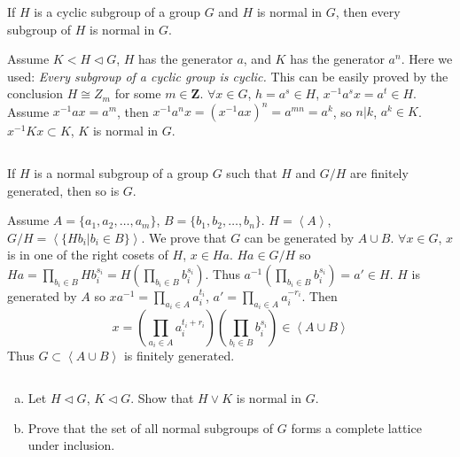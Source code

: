 $$ $$

\begin{ex}
    If $H$ is a cyclic subgroup of a group $G$ and $H$ is normal in $G$, then every subgroup of $H$ is normal in $G$.
\end{ex}

\begin{answer}
    Assume $K<H\lhd G$, $H$ has the generator $a$, and $K$ has the generator $a^{n}$. Here we used: \emph{Every subgroup of a cyclic group is cyclic.} This can be easily proved by the conclusion $H\cong Z_{m}$ for some $m\in \mathbf{Z}$. $\forall x\in G$, $h=a^{s}\in H$, $x^{-1}a^{s}x=a^{t}\in H$. Assume $x^{-1}ax=a^{m}$, then $x^{-1}a^{n}x=(x^{-1}ax)^{n}=a^{mn}=a^{k}$, so $n|k$, $a^{k}\in K$. $x^{-1}Kx\subset K$, $K$ is normal in $G$.
\end{answer}

$$ $$

\begin{ex}
    If $H$ is a normal subgroup of a group $G$ such that $H$ and $G/H$ are finitely generated, then so is $G$.
\end{ex}

\begin{answer}
    Assume $A=\{a_{1},a_{2},\dots, a_{m}\}$, $B=\{b_{1}, b_{2},\dots, b_{n}\}$. $H=\left\langle A\right\rangle$, $G /H=\left\langle \{Hb_{i}|b_{i}\in B\}\right\rangle$. We prove that $G$ can be generated by $A\cup B$. $\forall x\in G$, $x$ is in one of the right cosets of $H$, $x\in Ha$. $Ha\in G /H$ so $Ha=\prod\limits_{b_{i}\in B}Hb_{i}^{s_{i}}=H(\prod\limits_{b_{i}\in B}b_{i}^{s_{i}})$. Thus $a^{-1}(\prod\limits_{b_{i}\in B}b_{i}^{s_{i}})=a'\in H$. $H$ is generated by $A$ so $xa^{-1}=\prod\limits_{a_{i}\in A}a_{i}^{t_{i}}$, $a'=\prod\limits_{a_{i}\in A}a_{i}^{-r_{i}}$. Then \[x=(\prod\limits_{a_{i}\in A}a_{i}^{t_{i}+r_{i}})(\prod\limits_{b_{i}\in B}b_{i}^{s_{i}})\in\left\langle A\cup B\right\rangle\] Thus $G\subset\left\langle A\cup B\right\rangle$ is finitely generated.
\end{answer}

$$ $$

\begin{ex}
    \begin{enumerate}[(a)]
        \item Let $H\lhd G$, $K\lhd G$. Show that $H\vee K$ is normal in $G$.
        \item Prove that the set of all normal subgroups of $G$ forms a complete lattice under inclusion.
    \end{enumerate}
\end{ex}

